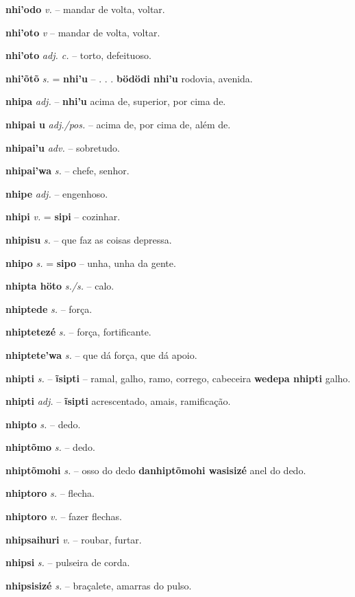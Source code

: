 \textbf{nhi'odo} \textit{v.} -- mandar de volta, voltar.

\textbf{nhi'oto} \textit{v} -- mandar de volta, voltar.

\textbf{nhi'oto} \textit{adj. c.} -- torto, defeituoso.

\textbf{nhi'õtõ} \textit{s.} = \textbf{nhi'u} -- . . .  \textbf{bödödi nhi'u} rodovia, avenida.

\textbf{nhipa} \textit{adj.} -- \textbf{nhi'u} acima de, superior, por cima de.

\textbf{nhipai u} \textit{adj./pos.} -- acima de, por cima de, além de.

\textbf{nhipai'u} \textit{adv.} -- sobretudo.

\textbf{nhipai'wa} \textit{s.} -- chefe, senhor.

\textbf{nhipe} \textit{adj.} -- engenhoso.

\textbf{nhipi} \textit{v.} = \textbf{sipi} -- cozinhar.

\textbf{nhipisu} \textit{s.} -- que faz as coisas depressa.

\textbf{nhipo} \textit{s.} = \textbf{sipo} -- unha, unha da gente.

\textbf{nhipta höto} \textit{s./s.} -- calo.

\textbf{nhiptede} \textit{s.} -- força.

\textbf{nhiptetezé} \textit{s.} -- força, fortificante.

\textbf{nhiptete'wa} \textit{s.} -- que dá força, que dá apoio.

\textbf{nhipti} \textit{s.} -- \textbf{ĩsipti} -- ramal, galho, ramo, corrego, cabeceira  \textbf{wedepa nhipti} galho.

\textbf{nhipti} \textit{adj.} -- \textbf{ĩsipti} acrescentado, amais, ramificação.

\textbf{nhipto} \textit{s.} -- dedo.

\textbf{nhiptõmo} \textit{s.} -- dedo.

\textbf{nhiptõmohi} \textit{s.} -- osso do dedo  \textbf{danhiptõmohi wasisizé} anel do dedo.

\textbf{nhiptoro} \textit{s.} -- flecha.

\textbf{nhiptoro} \textit{v.} -- fazer flechas.

\textbf{nhipsaihuri} \textit{v.} -- roubar, furtar.

\textbf{nhipsi} \textit{s.} -- pulseira de corda.

\textbf{nhipsisizé} \textit{s.} -- braçalete, amarras do pulso.

